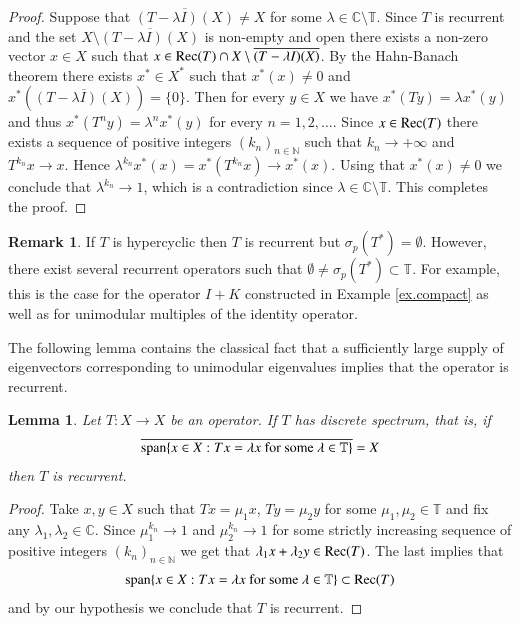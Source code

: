 \documentclass[12pt,leqno]{amsart}
\theoremstyle{plain}
\newtheorem{lemma}[equation]{Lemma}
\theoremstyle{definition}
\newtheorem{remark}[equation]{Remark}
\numberwithin{equation}{section}
\begin{document}
\begin{proof}
	Suppose that $\overline{(T-\lambda I)(X)}\neq X$ for some $\lambda \in \mathbb{C}\setminus \mathbb T$. Since $T$ is recurrent and the set $X\setminus \overline{(T-\lambda I)(X)}$ is non-empty and open there exists a non-zero vector $x\in X$ such that $x\in {\textnormal{Rec}}(T)\cap X\setminus \overline{(T-\lambda I)(X)}$. By the Hahn-Banach theorem there exists $x^*\in X^*$ such that $x^*(x)\neq 0$ and $x^*(\overline{(T-\lambda I)(X)})=\{ 0\}$. Then for every $y\in X$ we have $x^*(Ty)=\lambda x^*(y)$ and thus $x^*(T^ny)={\lambda}^nx^*(y)$ for every $n=1,2,\ldots $. Since $x\in {\textnormal{Rec}}(T)$ there exists a sequence of positive integers $(k_n)_{n\in\mathbb N}$ such that $k_n\to +\infty $ and $T^{k_n}x\to x$. Hence ${\lambda }^{k_n}x^*(x)=x^*(T^{k_n}x)\to x^*(x)$. Using that $x^*(x)\neq 0$ we conclude that ${\lambda }^{k_n}\to 1$, which is a contradiction since $\lambda \in \mathbb{C}\setminus \mathbb T$. This completes the proof. 
\end{proof}

\begin{remark}
	If $T$ is hypercyclic then $T$ is recurrent but $\sigma_p(T^*)=\emptyset$. However, there exist several recurrent operators such that $\emptyset \neq \sigma_p(T^*)\subset \mathbb T$. For example, this is the case for the operator $I+K$ constructed in Example \ref{ex.compact} as well as for unimodular multiples of the identity operator. 
\end{remark}

The following lemma contains the classical fact that a sufficiently large supply of eigenvectors corresponding to unimodular eigenvalues implies that the operator is recurrent. 

\begin{lemma}
	\label{l.suffrecurrent} Let $T:X\to X$ be an operator. If $T$ has \emph{discrete spectrum}, that is, if 
	\begin{align}
		\label{e.unimod} \overline{ \textnormal{span} \{ x\in X:Tx=\lambda x \ \text{for some}\ \lambda \in {\mathbb T} \} }=X 
	\end{align}
	then $T$ is recurrent. 
\end{lemma}

\begin{proof}
	Take $x,y\in X$ such that $Tx=\mu_1 x$, $Ty=\mu_2 y$ for some $\mu_1,\mu_2 \in {\mathbb T}$ and fix any $\lambda_1 ,\lambda_2\in {\mathbb C}$. Since $\mu_1 ^{k_n}\to 1$ and $\mu_2 ^{k_n}\to 1$ for some strictly increasing sequence of positive integers $(k_n)_{n\in\mathbb N}	$ we get that $\lambda_1x+\lambda_2y\in {\textnormal{Rec}}(T)$. The last implies that 
	\begin{align*}
		\textnormal{span}\{ x\in X: Tx=\lambda x \ \text{for some} \ \lambda \in {\mathbb T} \} \subset {\textnormal{Rec}}(T) 
	\end{align*}
	and by our hypothesis we conclude that $T$ is recurrent. 
\end{proof}
\end{document}
